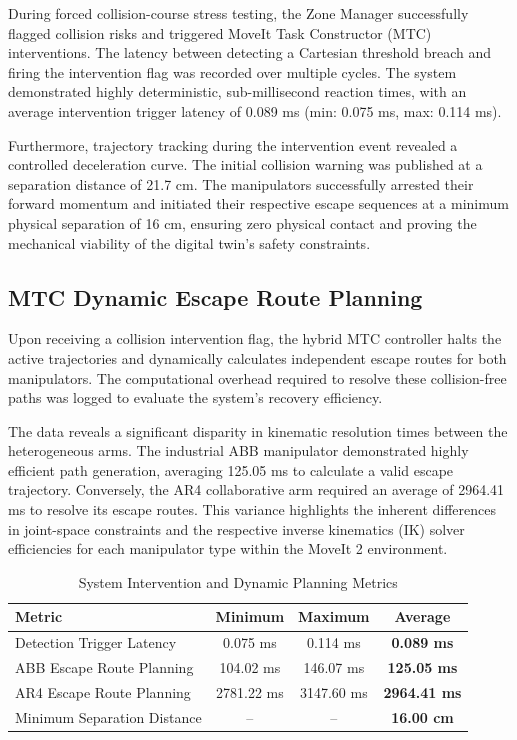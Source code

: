 During forced collision-course stress testing, the Zone Manager successfully flagged collision risks and triggered MoveIt Task Constructor (MTC) interventions. The latency between detecting a Cartesian threshold breach and firing the intervention flag was recorded over multiple cycles. The system demonstrated highly deterministic, sub-millisecond reaction times, with an average intervention trigger latency of 0.089 ms (min: 0.075 ms, max: 0.114 ms). 

Furthermore, trajectory tracking during the intervention event revealed a controlled deceleration curve. The initial collision warning was published at a separation distance of 21.7 cm. The manipulators successfully arrested their forward momentum and initiated their respective escape sequences at a minimum physical separation of 16 cm, ensuring zero physical contact and proving the mechanical viability of the digital twin's safety constraints.

\subsection{MTC Dynamic Escape Route Planning}

Upon receiving a collision intervention flag, the hybrid MTC controller halts the active trajectories and dynamically calculates independent escape routes for both manipulators. The computational overhead required to resolve these collision-free paths was logged to evaluate the system's recovery efficiency.

The data reveals a significant disparity in kinematic resolution times between the heterogeneous arms. The industrial ABB manipulator demonstrated highly efficient path generation, averaging 125.05 ms to calculate a valid escape trajectory. Conversely, the AR4 collaborative arm required an average of 2964.41 ms to resolve its escape routes. This variance highlights the inherent differences in joint-space constraints and the respective inverse kinematics (IK) solver efficiencies for each manipulator type within the MoveIt 2 environment.

\begin{table}[H]
\centering
\caption{System Intervention and Dynamic Planning Metrics}
\label{tab:mtc_zone_metrics}
\renewcommand{\arraystretch}{1.3}
\begin{tabular}{lccc}
\toprule
\textbf{Metric} & \textbf{Minimum} & \textbf{Maximum} & \textbf{Average} \\ 
\midrule
Detection Trigger Latency & 0.075 ms & 0.114 ms & \textbf{0.089 ms} \\ 
ABB Escape Route Planning & 104.02 ms & 146.07 ms & \textbf{125.05 ms} \\ 
AR4 Escape Route Planning & 2781.22 ms & 3147.60 ms & \textbf{2964.41 ms} \\ 
Minimum Separation Distance & -- & -- & \textbf{16.00 cm} \\
\bottomrule
\end{tabular}
\end{table}

